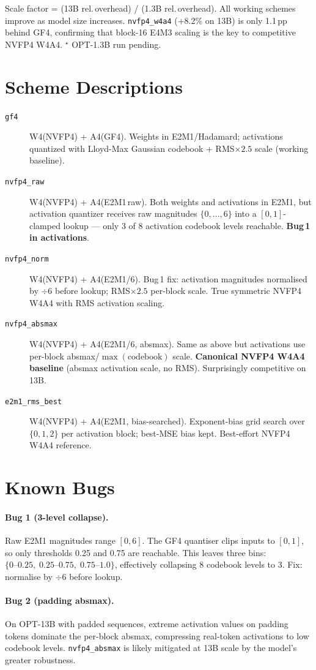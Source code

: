 \documentclass{article}
\begin{document}
Scale factor = (13B rel.\,overhead) / (1.3B rel.\,overhead).
All working schemes improve as model size increases.
\texttt{nvfp4\_w4a4} (+8.2\% on 13B) is only 1.1\,pp behind GF4,
confirming that block-16 E4M3 scaling is the key to competitive NVFP4 W4A4.
$^\star$ OPT-1.3B run pending.

\section{Scheme Descriptions}

\begin{description}
  \item[\texttt{gf4}] W4(NVFP4) + A4(GF4). Weights in E2M1/Hadamard; activations
    quantized with Lloyd-Max Gaussian codebook + RMS$\times2.5$ scale (working baseline).
  \item[\texttt{nvfp4\_raw}] W4(NVFP4) + A4(E2M1\,raw). Both weights and activations
    in E2M1, but activation quantizer receives raw magnitudes $\{0,\ldots,6\}$ into
    a $[0,1]$-clamped lookup --- only 3 of 8 activation codebook levels reachable.
    \textbf{Bug\,1 in activations}.
  \item[\texttt{nvfp4\_norm}] W4(NVFP4) + A4(E2M1/6). Bug\,1 fix: activation magnitudes
    normalised by $\div6$ before lookup; RMS$\times2.5$ per-block scale.
    True symmetric NVFP4 W4A4 with RMS activation scaling.
  \item[\texttt{nvfp4\_absmax}] W4(NVFP4) + A4(E2M1/6, absmax). Same as above but
    activations use per-block absmax/$\max(\text{codebook})$ scale.
    \textbf{Canonical NVFP4 W4A4 baseline} (absmax activation scale, no RMS).
    Surprisingly competitive on 13B.
  \item[\texttt{e2m1\_rms\_best}] W4(NVFP4) + A4(E2M1, bias-searched).
    Exponent-bias grid search over $\{0,1,2\}$ per activation block; best-MSE bias kept.
    Best-effort NVFP4 W4A4 reference.
\end{description}

\section{Known Bugs}

\paragraph{Bug 1 (3-level collapse).}
Raw E2M1 magnitudes range $[0, 6]$.  The GF4 quantiser clips inputs to $[0,1]$, so only
thresholds 0.25 and 0.75 are reachable.  This leaves three bins: $\{0\text{--}0.25,\;
0.25\text{--}0.75,\;0.75\text{--}1.0\}$, effectively collapsing 8 codebook levels to 3.
Fix: normalise by $\div 6$ before lookup.

\paragraph{Bug 2 (padding absmax).}
On OPT-13B with padded sequences, extreme activation values on padding tokens dominate
the per-block absmax, compressing real-token activations to low codebook levels.
\texttt{nvfp4\_absmax} is likely mitigated at 13B scale by the model's greater robustness.
\end{document}
